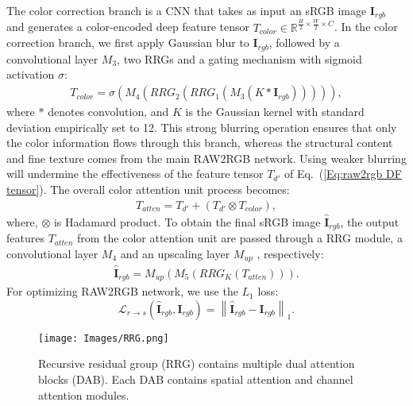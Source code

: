 \documentclass[10pt,twocolumn,letterpaper]{article}
\begin{document}
The color correction branch is a CNN that takes as input an sRGB image $\mathbf{I}_{rgb}$ and generates a color-encoded deep feature tensor $T_{color}\in \mathbb{R}^{\frac{H}{2}{\times}\frac{W}{2}{\times} C}$. 
In the color correction branch, we first apply Gaussian blur to $\mathbf{I}_{rgb}$, followed by a convolutional layer $M_3$, two RRGs and a gating mechanism with sigmoid activation $\sigma$:
\begin{align}
T_{color} = \sigma(M_4(RRG_2(RRG_1( M_3(K\ast \mathbf{I}_{rgb}) )))),
\label{Eq:ccb}
\end{align}
where $\ast$ denotes convolution, and $K$ is the Gaussian kernel with standard deviation empirically set to 12. 
This strong blurring operation ensures that only the color information flows through this branch, whereas the structural content and fine texture comes from the main RAW2RGB network. 
Using weaker blurring will undermine the effectiveness of the feature tensor $T_{d'}$ of Eq.~(\ref{Eq:raw2rgb DF tensor}). 
The overall color attention unit process becomes:
\begin{align}
T_{atten} = T_{d'} + (T_{d'} \otimes T_{color}),
\label{Eq:ccb unit}
\end{align}
where, $\otimes $ is Hadamard product. 
To obtain the final sRGB image $\hat{\mathbf{I}}_{rgb}$, the output features $T_{atten}$ from the color attention unit are passed through a RRG module, a convolutional layer $M_4$ and an upscaling layer $M_{up}$ \cite{Shi2016}, respectively:
\begin{align}
\hat{\mathbf{I}}_{rgb} = M_{up}(M_5(RRG_K(T_{atten}))).
\label{Eq:raw2rgb}
\end{align}
For optimizing RAW2RGB network, we use the $L_1$ loss:
\begin{equation}
\label{Eq:loss raw2rgb}
\mathcal{L}_{{r\rightarrow s}}(\hat{\mathbf{I}}_{rgb},\mathbf{I}_{rgb})
=
\left \| \hat{\mathbf{I}}_{rgb} - \mathbf{I}_{rgb}  \right \|_{1} .
\end{equation}


\begin{figure}[t!]
\begin{center}
 \texttt{[image: Images/RRG.png]}  
\end{center}\vspace{-1.4em}
    \caption{Recursive residual group (RRG) contains multiple dual attention blocks (DAB). Each DAB contains spatial attention and channel attention modules.}\vspace{-0.5em}
    \label{Fig:rrg}
\vspace{-2mm}
\end{figure}
\end{document}
